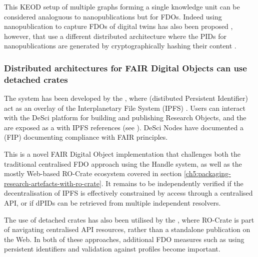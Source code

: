 This KEOD setup of multiple graphs forming a single knowledge unit can be considered analoguous to nanopublications \cite{Kuhn 2021} but for FDOs. Indeed using nanopublication to capture FDOs of digital twins has also been proposed \cite{10.3389/data.2022.883341}, however, that use a different distributed architecture where the PIDs for nanopublications are generated by cryptographically hashing their content \cite{Kuhn 2021}.


\subsubsection{Distributed architectures for FAIR Digital Objects can use detached crates}
\label{ch61:dpid}

The  system has been developed by the , where  (distibuted Persistent Identifier) act  as an overlay of the Interplanetary File System (IPFS) \cite{Trautwein 2022}. 
Users can interact with the DeSci platform for building and publishing Research Objects, and the  are exposed as a  with IPFS references (see ). 
DeSci Nodes have documented a  (FIP) \cite{FIP} documenting compliance with FAIR principles. 

This is a novel FAIR Digital Object implementation that challenges both the traditional centralised FDO approach using the Handle system, as well as the mostly Web-based RO-Crate ecosystem covered in section \vref{ch5:packaging-research-artefacts-with-ro-crate}. It remains to be independently verified if the decentralisation of IPFS is effectively constrained by access through a centralised API, or if dPIDs can be retrieved from multiple independent resolvers.

The use of detached crates has also been utilised by the , where RO-Crate is part of navigating centralised API resources, rather than a standalone publication on the Web. In both of these approaches, additional FDO measures such as using persistent identifiers and validation against profiles become important. 


